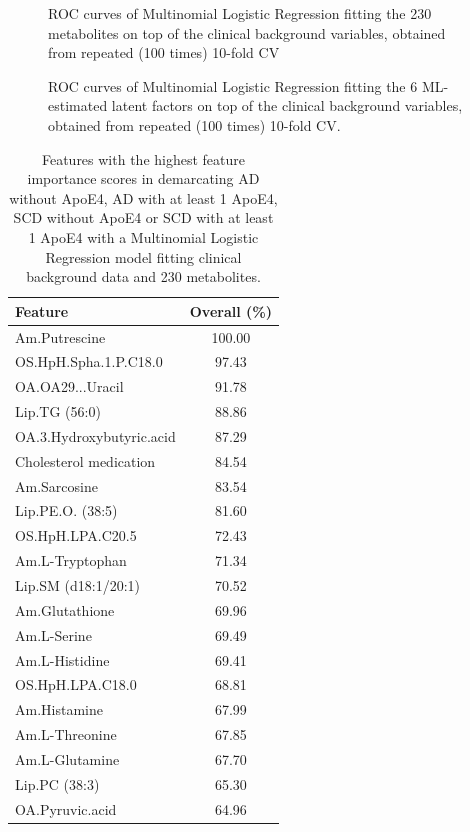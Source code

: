\documentclass{amsart}
\begin{document}
\begin{figure}[h]
    
    \caption{ROC curves of Multinomial Logistic Regression fitting the 230 metabolites on top of the clinical background variables, obtained from repeated (100 times) 10-fold CV}
    \label{roc:full}
  \end{figure}
  \begin{figure}[ht]
    
    \caption{ROC curves of Multinomial Logistic Regression fitting the 6 ML-estimated latent factors on top of the clinical background variables, obtained from repeated (100 times) 10-fold CV.}
    \label{roc:6mlogit}
\end{figure}

\begin{table}[hb] \label{tab:fimp}
	\centering
	\caption{Features with the highest feature importance scores in demarcating AD without ApoE4, AD with at least 1 ApoE4, SCD without ApoE4 or SCD with at least 1 ApoE4 with a Multinomial Logistic Regression model fitting clinical background data and 230 metabolites. }
	\begin{tabular}{lc}
		\toprule
		Feature & Overall (\%) \\ \midrule
    Am.Putrescine            & 100.00 \\
    OS.HpH.Spha.1.P.C18.0    & 97.43  \\
    OA.OA29...Uracil         & 91.78  \\
    Lip.TG (56:0)             & 88.86  \\
    OA.3.Hydroxybutyric.acid & 87.29  \\
    Cholesterol medication   & 84.54  \\
    Am.Sarcosine             & 83.54  \\
    Lip.PE.O. (38:5)           & 81.60  \\
    OS.HpH.LPA.C20.5         & 72.43  \\
    Am.L-Tryptophan          & 71.34  \\
    Lip.SM (d18:1/20:1)       & 70.52  \\
    Am.Glutathione           & 69.96  \\
    Am.L-Serine              & 69.49  \\
    Am.L-Histidine           & 69.41  \\
    OS.HpH.LPA.C18.0         & 68.81  \\
    Am.Histamine             & 67.99  \\
    Am.L-Threonine           & 67.85  \\
    Am.L-Glutamine           & 67.70  \\
    Lip.PC (38:3)             & 65.30  \\
    OA.Pyruvic.acid          & 64.96 \\ \bottomrule

	\end{tabular}
\end{table}
\clearpage
\end{document}
